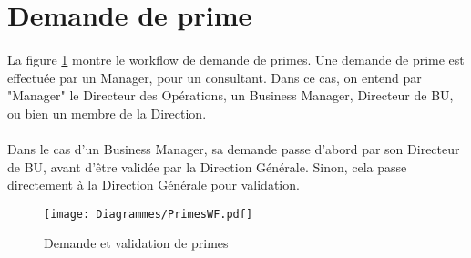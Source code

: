 \section{Demande de prime}
\paragraph{} La figure \ref{primes} montre le workflow de demande de primes. Une demande de prime est effectuée par un Manager, pour un consultant. Dans ce cas, on entend par "Manager" le Directeur des Opérations, un Business Manager, Directeur de BU, ou bien un membre de la Direction.
\paragraph{} Dans le cas d'un Business Manager, sa demande passe d'abord par son Directeur de BU, avant d'être validée par la Direction Générale. Sinon, cela passe directement à la Direction Générale pour validation.



\begin{figure}[H]
	\centering
	\texttt{[image: Diagrammes/PrimesWF.pdf]}
	\caption{Demande et validation de primes} 
	\label{primes}
\end{figure}


